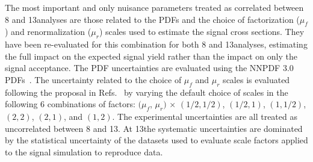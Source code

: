 \begin{table}[htb]
  \centering
  \caption{Correlation of systematic uncertainties in the signal prediction across analyses. A ``yes'' signifies 100\% correlation, and ``no'' means uncorrelated.}
  \label{tab:correlations}
\end{table}

The most important and only nuisance parameters treated as correlated between 8 and 13\TeV analyses are those related to the PDFs and the choice of factorization ($\mu_{f}$) and renormalization ($\mu_{r}$) scales used to estimate the signal cross sections.
They have been re-evaluated for this combination for both 8 and 13\TeV analyses, estimating the full impact on the expected signal yield rather than the impact on only the signal acceptance.
The PDF uncertainties are evaluated using the NNPDF 3.0 PDFs~\cite{Ball:2014uwa}.
The uncertainty related to the choice of $\mu_{f}$ and $\mu_{r}$ scales is evaluated following the proposal in Refs.~\cite{Cacciari:2003fi,Catani:2003zt} by varying the default choice of scales in the following 6 combinations of factors:
$(\mu_{f}$, $\mu_{r})$ $\times$ $(1/2, 1/2)$, $(1/2, 1)$, $(1,1/2)$, $(2, 2)$, $(2, 1)$, and $(1, 2)$.
The experimental uncertainties are all treated as uncorrelated between 8 and 13\TeV. At 13\TeV the systematic uncertainties are dominated by the statistical uncertainty of the datasets used to evaluate scale factors applied to the signal simulation to reproduce data.

